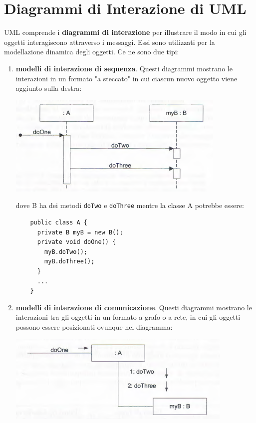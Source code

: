 \documentclass[a4paper,12pt, oneside]{book}
\begin{document}
\section{Diagrammi di Interazione di UML}
UML comprende i \textbf{diagrammi di interazione} per illustrare il modo in cui gli oggetti interagiscono attraverso i messaggi. Essi sono utilizzati per la modellazione dinamica degli oggetti. Ce ne sono due tipi:
\begin{enumerate}
	\item \textbf{modelli di interazione di sequenza}. Questi diagrammi mostrano le interazioni in un formato "a steccato" in cui ciascun nuovo oggetto viene aggiunto sulla destra:
	\begin{center}
		\includegraphics[scale=0.7]{img/seqd.png}
	\end{center}
	\newpage
	dove B ha dei metodi \texttt{doTwo} e \texttt{doThree} mentre la classe A potrebbe essere:	
    \begin{verbatim}
    public class A {
      private B myB = new B();
      private void doOne() {
        myB.doTwo();
        myB.doThree();
      }
      ...
    }    
    \end{verbatim}  
	\item \textbf{modelli di interazione di comunicazione}. Questi diagrammi mostrano le interazioni tra gli oggetti in un formato a grafo o a rete, in cui gli oggetti possono essere posizionati ovunque nel diagramma:
	\begin{center}
		\includegraphics[scale=0.7]{img/comd.png}
	\end{center}
\end{enumerate}
\end{document}
